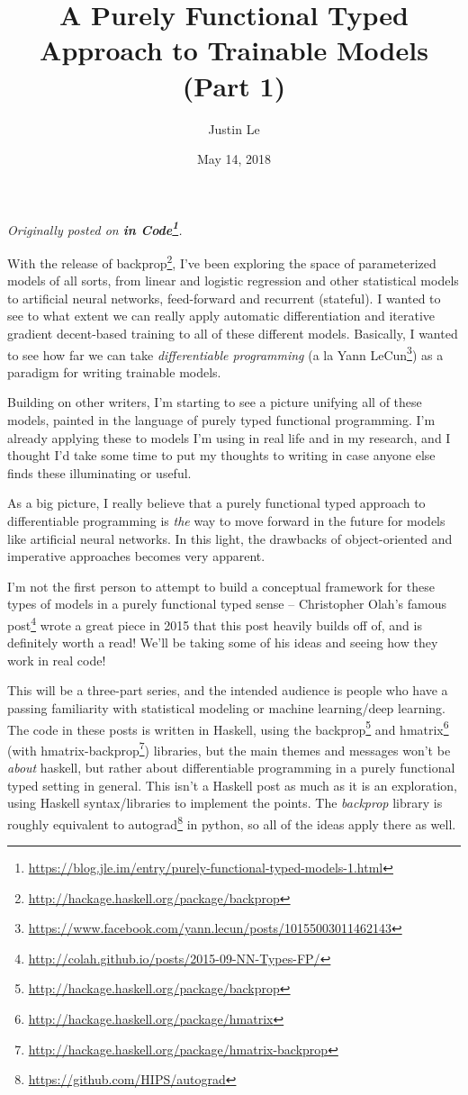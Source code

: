 \documentclass[]{article}
\title{A Purely Functional Typed Approach to Trainable Models (Part 1)}
\author{Justin Le}
\date{May 14, 2018}
\renewcommand{\href}[2]{#2\footnote{\url{#1}}}
\begin{document}
\maketitle

\emph{Originally posted on
\textbf{\href{https://blog.jle.im/entry/purely-functional-typed-models-1.html}{in
Code}}.}

With the release of
\href{http://hackage.haskell.org/package/backprop}{backprop}, I've been
exploring the space of parameterized models of all sorts, from linear and
logistic regression and other statistical models to artificial neural networks,
feed-forward and recurrent (stateful). I wanted to see to what extent we can
really apply automatic differentiation and iterative gradient decent-based
training to all of these different models. Basically, I wanted to see how far we
can take \emph{differentiable programming} (a la
\href{https://www.facebook.com/yann.lecun/posts/10155003011462143}{Yann LeCun})
as a paradigm for writing trainable models.

Building on other writers, I'm starting to see a picture unifying all of these
models, painted in the language of purely typed functional programming. I'm
already applying these to models I'm using in real life and in my research, and
I thought I'd take some time to put my thoughts to writing in case anyone else
finds these illuminating or useful.

As a big picture, I really believe that a purely functional typed approach to
differentiable programming is \emph{the} way to move forward in the future for
models like artificial neural networks. In this light, the drawbacks of
object-oriented and imperative approaches becomes very apparent.

I'm not the first person to attempt to build a conceptual framework for these
types of models in a purely functional typed sense --
\href{http://colah.github.io/posts/2015-09-NN-Types-FP/}{Christopher Olah's
famous post} wrote a great piece in 2015 that this post heavily builds off of,
and is definitely worth a read! We'll be taking some of his ideas and seeing how
they work in real code!

This will be a three-part series, and the intended audience is people who have a
passing familiarity with statistical modeling or machine learning/deep learning.
The code in these posts is written in Haskell, using the
\href{http://hackage.haskell.org/package/backprop}{backprop} and
\href{http://hackage.haskell.org/package/hmatrix}{hmatrix} (with
\href{http://hackage.haskell.org/package/hmatrix-backprop}{hmatrix-backprop})
libraries, but the main themes and messages won't be \emph{about} haskell, but
rather about differentiable programming in a purely functional typed setting in
general. This isn't a Haskell post as much as it is an exploration, using
Haskell syntax/libraries to implement the points. The \emph{backprop} library is
roughly equivalent to \href{https://github.com/HIPS/autograd}{autograd} in
python, so all of the ideas apply there as well.
\end{document}
